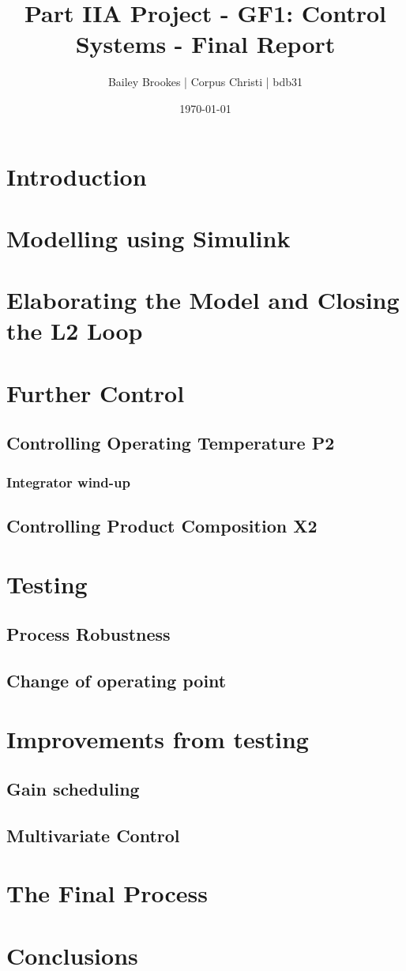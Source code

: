 \documentclass[12pt]{article}
\title{Part IIA Project - GF1: Control Systems - Final Report}
\author{Bailey Brookes | Corpus Christi | bdb31}
\date{\today}
\begin{document}
\maketitle

\begin{abstract}

\end{abstract}

\tableofcontents

\section{Introduction}
\section{Modelling using Simulink}
\section{Elaborating the Model and Closing the L2 Loop}
\section{Further Control}
\subsection{Controlling Operating Temperature P2}
\subsubsection{Integrator wind-up}
\subsection{Controlling Product Composition X2}
\section{Testing}
\subsection{Process Robustness}
\subsection{Change of operating point}
\section{Improvements from testing}
\subsection{Gain scheduling}
\subsection{Multivariate Control}
\section{The Final Process}
\section{Conclusions}
\end{document}
